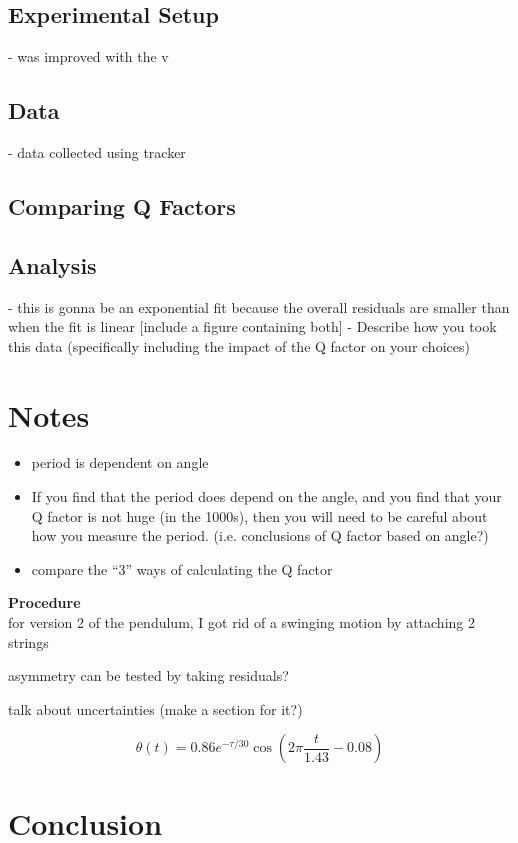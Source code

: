 \documentclass[12pt]{article}
\begin{document}
\subsection{Experimental Setup}
- was improved with the v
\subsection{Data}
- data collected using tracker
\subsection{Comparing Q Factors}
\subsection{Analysis}
- this is gonna be an exponential fit because the overall residuals are smaller than when the fit is linear [include a figure containing both]
- Describe how you took this data (specifically including the impact of the Q factor on your choices)

\section{Notes}


\begin{itemize}
    \item period is dependent on angle \cite*{what-is-yeast}
    \item If you find that the period does depend on the angle, and you find that your Q factor is not huge (in the 1000s), then you will need to be careful about how you measure the period. (i.e. conclusions of Q factor based on angle?)
    \item compare the ``3'' ways of calculating the Q factor
\end{itemize}


\textbf{Procedure}\\
for version 2 of the pendulum, I got rid of a swinging motion by attaching 2 strings

asymmetry can be tested by taking residuals?

talk about uncertainties (make a section for it?)

\begin{equation}
    \theta(t) = 0.86 e^{-{\tau/30}} \cos\left(2 \pi \frac{t}{1.43} - 0.08\right)
\end{equation}

\section*{Conclusion}

\newpage

\printbibliography
\end{document}
